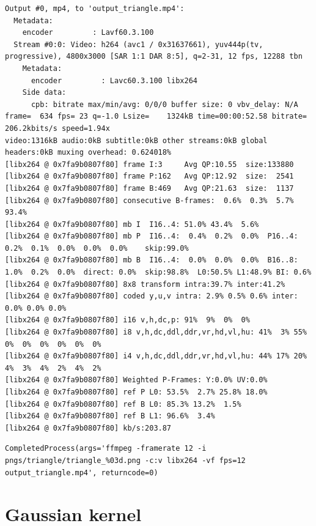 \documentclass[
  letterpaper,
  DIV=11,
  numbers=noendperiod,
  oneside]{scrreprt}
\begin{document}
\begin{verbatim}
Output #0, mp4, to 'output_triangle.mp4':
  Metadata:
    encoder         : Lavf60.3.100
  Stream #0:0: Video: h264 (avc1 / 0x31637661), yuv444p(tv, progressive), 4800x3000 [SAR 1:1 DAR 8:5], q=2-31, 12 fps, 12288 tbn
    Metadata:
      encoder         : Lavc60.3.100 libx264
    Side data:
      cpb: bitrate max/min/avg: 0/0/0 buffer size: 0 vbv_delay: N/A
frame=  634 fps= 23 q=-1.0 Lsize=    1324kB time=00:00:52.58 bitrate= 206.2kbits/s speed=1.94x     
video:1316kB audio:0kB subtitle:0kB other streams:0kB global headers:0kB muxing overhead: 0.624018%
[libx264 @ 0x7fa9b0807f80] frame I:3     Avg QP:10.55  size:133880
[libx264 @ 0x7fa9b0807f80] frame P:162   Avg QP:12.92  size:  2541
[libx264 @ 0x7fa9b0807f80] frame B:469   Avg QP:21.63  size:  1137
[libx264 @ 0x7fa9b0807f80] consecutive B-frames:  0.6%  0.3%  5.7% 93.4%
[libx264 @ 0x7fa9b0807f80] mb I  I16..4: 51.0% 43.4%  5.6%
[libx264 @ 0x7fa9b0807f80] mb P  I16..4:  0.4%  0.2%  0.0%  P16..4:  0.2%  0.1%  0.0%  0.0%  0.0%    skip:99.0%
[libx264 @ 0x7fa9b0807f80] mb B  I16..4:  0.0%  0.0%  0.0%  B16..8:  1.0%  0.2%  0.0%  direct: 0.0%  skip:98.8%  L0:50.5% L1:48.9% BI: 0.6%
[libx264 @ 0x7fa9b0807f80] 8x8 transform intra:39.7% inter:41.2%
[libx264 @ 0x7fa9b0807f80] coded y,u,v intra: 2.9% 0.5% 0.6% inter: 0.0% 0.0% 0.0%
[libx264 @ 0x7fa9b0807f80] i16 v,h,dc,p: 91%  9%  0%  0%
[libx264 @ 0x7fa9b0807f80] i8 v,h,dc,ddl,ddr,vr,hd,vl,hu: 41%  3% 55%  0%  0%  0%  0%  0%  0%
[libx264 @ 0x7fa9b0807f80] i4 v,h,dc,ddl,ddr,vr,hd,vl,hu: 44% 17% 20%  4%  3%  4%  2%  4%  2%
[libx264 @ 0x7fa9b0807f80] Weighted P-Frames: Y:0.0% UV:0.0%
[libx264 @ 0x7fa9b0807f80] ref P L0: 53.5%  2.7% 25.8% 18.0%
[libx264 @ 0x7fa9b0807f80] ref B L0: 85.3% 13.2%  1.5%
[libx264 @ 0x7fa9b0807f80] ref B L1: 96.6%  3.4%
[libx264 @ 0x7fa9b0807f80] kb/s:203.87
\end{verbatim}

\begin{verbatim}
CompletedProcess(args='ffmpeg -framerate 12 -i pngs/triangle/triangle_%03d.png -c:v libx264 -vf fps=12 output_triangle.mp4', returncode=0)
\end{verbatim}

\hypertarget{gaussian-kernel}{%
\section{Gaussian kernel}\label{gaussian-kernel}}
\end{document}
